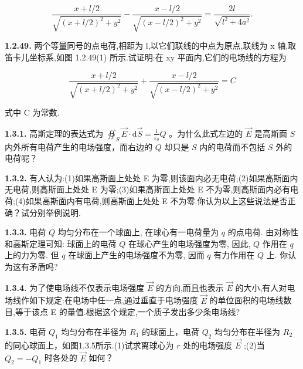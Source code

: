 $$
\frac {x + l / 2}{\sqrt {(x + l / 2) ^ {2} + y ^ {2}}} - \frac {x - l / 2}{\sqrt {(x - l / 2) ^ {2} + y ^ {2}}} = \frac {2 l}{\sqrt {l ^ {2} + 4 a ^ {2}}}.
$$


\begin{center}
\end{center}

\vfill

\newpage
\textbf{1.2.49.} 两个等量同号的点电荷,相距为 l,以它们联线的中点为原点,联线为 x 轴,取笛卡儿坐标系,如图 1.2.49(1) 所示.试证明:在 xy 平面内,它们的电场线的方程为

$$
\frac {x + l / 2}{\sqrt {(x + l / 2) ^ {2} + y ^ {2}}} + \frac {x - l / 2}{\sqrt {(x - l / 2) ^ {2} + y ^ {2}}} = C
$$

式中 C 为常数.

\vfill

\textbf{1.3.1.} 高斯定理的表达式为 $\displaystyle \oiint_{S} \vec{E} \cdot \mathrm{d}\vec{S} = \frac{1}{\varepsilon_0} Q$ 。为什么此式左边的 $\vec{E}$ 是高斯面 $S$ 内外所有电荷产生的电场强度，而右边的 $Q$ 却只是 $S$ 内的电荷而不包括 $S$ 外的电荷呢？

\vfill

\newpage
\textbf{1.3.2.} 有人认为:(1)如果高斯面上处处 E 为零,则该面内必无电荷;(2)如果高斯面内无电荷,则高斯面上处处 E 为零;(3)如果高斯面上处处 E 不为零,则高斯面内必有电荷;(4)如果高斯面内有电荷,则高斯面上处处 E 不为零.你认为以上这些说法是否正确？试分别举例说明.

\vfill

\textbf{1.3.3.} 电荷 $Q$ 均匀分布在一个球面上, 在球心有一电荷量为 $q$ 的点电荷. 由对称性和高斯定理可知: 球面上的电荷 $Q$ 在球心产生的电场强度为零, 因此, $Q$ 作用在 $q$ 上的力为零. 但 $q$ 在球面上产生的电场强度不为零, 因而 $q$ 有力作用在 $Q$ 上. 你认为这有矛盾吗?

\vfill

\newpage
\textbf{1.3.4.} 为了使电场线不仅表示电场强度 $\vec{E}$ 的方向,而且也表示 $\vec{E}$ 的大小,有人对电场线作如下规定:在电场中任一点,通过垂直于电场强度 $\vec{E}$ 的单位面积的电场线数目,等于该点 E 的量值.根据这个规定,一个质子发出多少条电场线?

\vfill

\textbf{1.3.5.} 电荷 $Q_{1}$ 均匀分布在半径为 $R_{1}$ 的球面上，电荷 $Q_{2}$ 均匀分布在半径为 $R_{2}$ 的同心球面上，如图1.3.5所示.(1)试求离球心为 $r$ 处的电场强度 $\vec{E}$ ;(2)当 $Q_{2} = -Q_{1}$ 时各处的 $\vec{E}$ 如何？

\vfill


